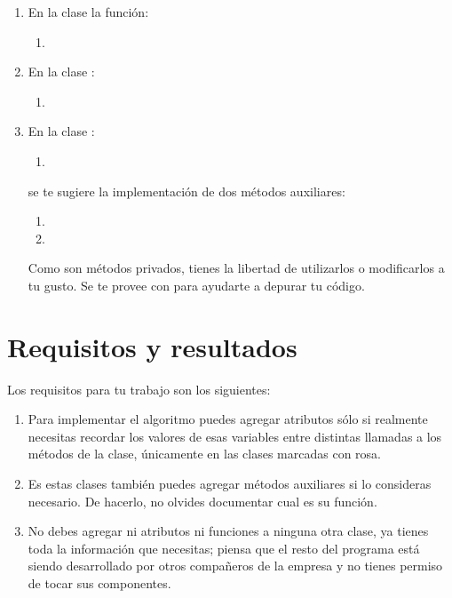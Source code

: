 \begin{enumerate}
 \item En la clase  la función:
 \begin{enumerate}
  \item {}
 \end{enumerate}

 \item En la clase :
 \begin{enumerate}
  \item {}
 \end{enumerate}


 \item En la clase :
 \begin{enumerate}
  \item {}
 \end{enumerate}
 se te sugiere la implementación de dos métodos auxiliares:
 \begin{enumerate}
  \item {}
  \item {}
 \end{enumerate}
 Como son métodos privados, tienes la libertad de utilizarlos o modificarlos a tu gusto.  Se te provee con  para ayudarte a depurar tu código.

\end{enumerate}

\section{Requisitos y resultados}

Los requisitos para tu trabajo son los siguientes:

\begin{enumerate}
 \item Para implementar el algoritmo puedes agregar atributos sólo si realmente necesitas recordar los valores de esas variables entre distintas llamadas a los métodos de la clase, únicamente en las clases marcadas con rosa.
 
 \item Es estas clases también puedes agregar métodos auxiliares si lo consideras necesario. De hacerlo, no olvides documentar cual es su función.
 
 \item No debes agregar ni atributos ni funciones a ninguna otra clase, ya tienes toda la información que necesitas; piensa que el resto del programa está siendo desarrollado por otros compañeros de la empresa y no tienes permiso de tocar sus componentes.
\end{enumerate}

